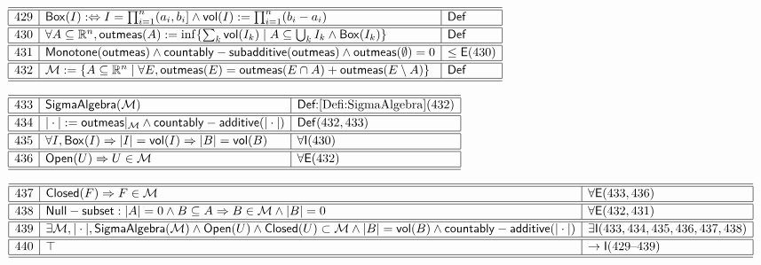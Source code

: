 \documentclass[11pt,reqno]{amsart}
\begin{document}
\noindent$%
\begin{array}{|r|l|l|}
\hline\hline
429 & \mathsf{Box}(I):\Leftrightarrow I=\prod_{i=1}^{n}(a_{i},b_{i}]\wedge\mathsf{vol}(I):=\prod_{i=1}^{n}(b_{i}-a_{i}) & \mathsf{Def} \\ \hline\hline
430 & \forall A\subseteq\mathbb{R}^{n},\mathsf{outmeas}(A):=\inf\{\sum_{k}\mathsf{vol}(I_{k})\mid A\subseteq\bigcup_{k}I_{k}\wedge\mathsf{Box}(I_{k})\} & \mathsf{Def} \\ \hline\hline
431 & \mathsf{Monotone}(\mathsf{outmeas})\wedge\mathsf{countably-subadditive}(\mathsf{outmeas})\wedge\mathsf{outmeas}(\emptyset)=0 & \le\mathsf{E}(430) \\ \hline\hline
432 & \mathcal{M}:=\{A\subseteq\mathbb{R}^{n}\mid\forall E,\mathsf{outmeas}(E)=\mathsf{outmeas}(E\cap A)+\mathsf{outmeas}(E\setminus A)\} & \mathsf{Def} \\ \hline\hline
\end{array}%
$

\medskip

\noindent$%
\begin{array}{|r|l|l|}
\hline\hline
433 & \mathsf{SigmaAlgebra}(\mathcal{M}) & \textsf{Def:}\ref{Defi:SigmaAlgebra}(432) \\ \hline\hline
434 & |\cdot|:=\mathsf{outmeas}|_{\mathcal{M}}\wedge\mathsf{countably-additive}(|\cdot|) & \mathsf{Def}(432,433) \\ \hline\hline
435 & \forall I,\mathsf{Box}(I)\Rightarrow|I|=\mathsf{vol}(I)\Rightarrow|B|=\mathsf{vol}(B) & \forall\mathsf{I}(430) \\ \hline\hline
436 & \mathsf{Open}(U)\Rightarrow U\in\mathcal{M} & \forall\mathsf{E}(432) \\ \hline\hline
\end{array}%
$

\medskip

\noindent$%
\begin{array}{|r|l|l|}
\hline\hline
437 & \mathsf{Closed}(F)\Rightarrow F\in\mathcal{M} & \forall\mathsf{E}(433,436) \\ \hline\hline
438 & \mathsf{Null-subset}:|A|=0\wedge B\subseteq A\Rightarrow B\in\mathcal{M}\wedge|B|=0 & \forall\mathsf{E}(432,431) \\ \hline\hline
439 & \exists\mathcal{M},|\cdot|,\mathsf{SigmaAlgebra}(\mathcal{M})\wedge\mathsf{Open}(U)\wedge\mathsf{Closed}(U)\subset\mathcal{M}\wedge|B|=\mathsf{vol}(B)\wedge\mathsf{countably-additive}(|\cdot|) & \exists\mathsf{I}(433,434,435,436,437,438) \\ \hline\hline
440 & \top & \to\mathsf{I}(429\text{--}439) \\ \hline\hline
\end{array}%
$
\end{document}
